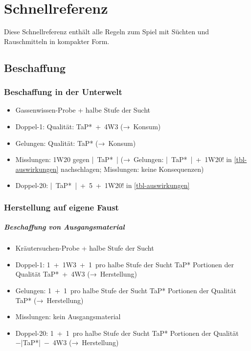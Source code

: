 \chapter{Schnellreferenz}
Diese Schnellreferenz enthält alle Regeln zum Spiel mit Süchten und Rauschmitteln in kompakter Form.

\begin{multicols}{2}
\section*{Beschaffung}
\subsection*{Beschaffung in der Unterwelt}
\begin{itemize}[nosep]
	\item Gassenwissen-Probe + halbe Stufe der Sucht
	\item Doppel-1: Qualität: TaP*~+~4W3 (→~Konsum)
	\item Gelungen: Qualität: TaP* (→~Konsum)
	\item Misslungen: 1W20 gegen |~TaP*~| (→~Gelungen: |~TaP*~|~+~1W20! in \vref{tbl-auswirkungen} nachschlagen; Misslungen: keine Konsequenzen)
	\item Doppel-20: |~TaP*~|~+~5~+~1W20! in \vref{tbl-auswirkungen}
\end{itemize}
\subsection*{Herstellung auf eigene Faust}
\paragraph*{Beschaffung von Ausgangsmaterial}
\begin{itemize}[nosep]
	\item Kräutersuchen-Probe + halbe Stufe der Sucht
	\item Doppel-1: 1~+~1W3~+~1~pro halbe Stufe der Sucht TaP* Portionen der Qualität TaP*~+~4W3 (→~Herstellung)
	\item Gelungen: 1~+~1~pro halbe Stufe der Sucht TaP* Portionen der Qualität TaP* (→~Herstellung)
	\item Misslungen: kein Ausgangsmaterial
	\item Doppel-20: 1~+~1~pro halbe Stufe der Sucht TaP* Portionen der Qualität −|TaP*|~−~4W3 (→~Herstellung)
\end{itemize}

\end{multicols}
